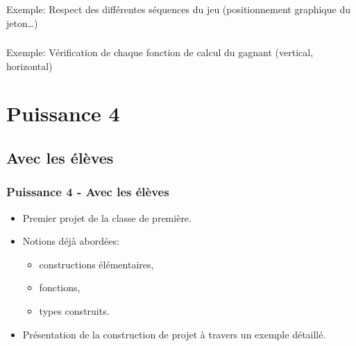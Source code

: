 \documentclass[svgnames,11pt]{beamer}
\begin{document}
\begin{frame}
    \frametitle{}

    \begin{center}
    \end{center}
    Exemple: Respect des différentes séquences du jeu (positionnement graphique du jeton\dots)
\end{frame}
\begin{frame}
    \frametitle{}

    \begin{center}
    \end{center}
    Exemple: Vérification de chaque fonction de calcul du gagnant (vertical, horizontal)
\end{frame}
\section{Puissance 4}
\subsection{Avec les élèves}
\begin{frame}
    \frametitle{Puissance 4 - Avec les élèves}

    \begin{itemize}
        \item <1->Premier projet de la classe de première.
        \item <2->Notions déjà abordées:
        \begin{itemize}
            \item constructions élémentaires,
            \item fonctions,
            \item types construits.
        \end{itemize}
        \item <3->Présentation de la construction de projet à travers un exemple détaillé.
    \end{itemize}

\end{frame}
\end{document}
